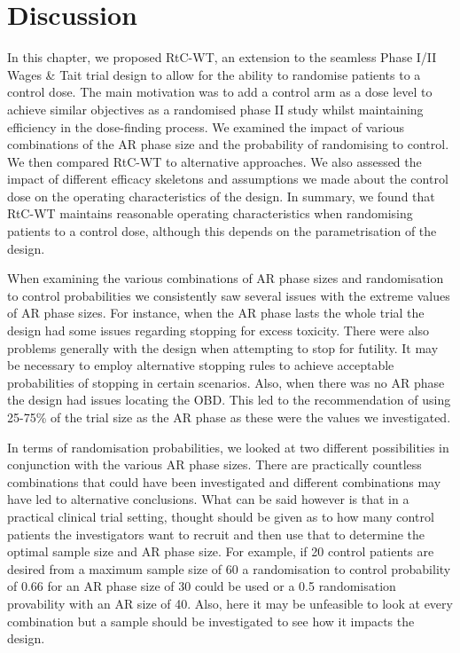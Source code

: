 \section{Discussion}
\label{WT:Discussion}

In this chapter, we proposed RtC-WT, an extension to the seamless Phase \RN{1}/\RN{2} Wages \& Tait trial design to allow for the ability to randomise patients to a control dose. The main motivation was to add a control arm as a dose level to achieve similar objectives as a randomised phase \RN{2} study whilst maintaining efficiency in the dose-finding process. We examined the impact of various combinations of the AR phase size and the probability of randomising to control. We then compared RtC-WT to alternative approaches. We also assessed the impact of different efficacy skeletons and assumptions we made about the control dose on the operating characteristics of the design. In summary, we found that RtC-WT maintains reasonable operating characteristics when randomising patients to a control dose, although this depends on the parametrisation of the design.   

When examining the various combinations of AR phase sizes and randomisation to control probabilities we consistently saw several issues with the extreme values of AR phase sizes. For instance, when the AR phase lasts the whole trial the design had some issues regarding stopping for excess toxicity. There were also problems generally with the design when attempting to stop for futility. It may be necessary to employ alternative stopping rules to achieve acceptable probabilities of stopping in certain scenarios. Also, when there was no AR phase the design had issues locating the OBD. This led to the recommendation of using 25-75\% of the trial size as the AR phase as these were the values we investigated. 

In terms of randomisation probabilities, we looked at two different possibilities in conjunction with the various AR phase sizes. There are practically countless combinations that could have been investigated and different combinations may have led to alternative conclusions. What can be said however is that in a practical clinical trial setting, thought should be given as to how many control patients the investigators want to recruit and then use that to determine the optimal sample size and AR phase size. For example, if 20 control patients are desired from a maximum sample size of 60 a randomisation to control probability of 0.66 for an AR phase size of 30 could be used or a 0.5 randomisation provability with an AR size of 40. Also, here it may be unfeasible to look at every combination but a sample should be investigated to see how it impacts the design. 

